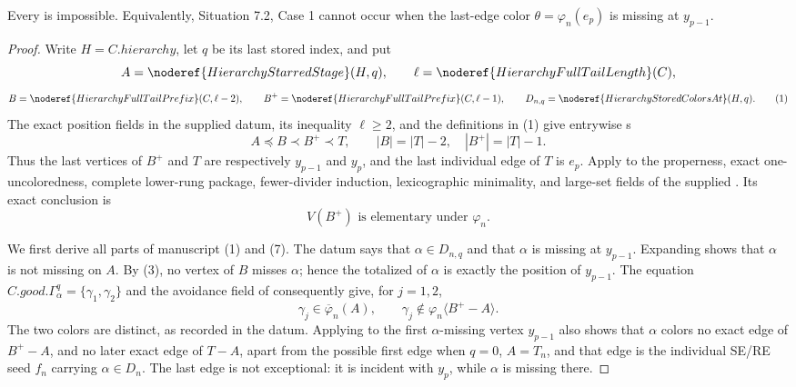\begin{lemma}
Every  is impossible.
Equivalently, Situation 7.2, Case 1 cannot occur when the last-edge color
\(\theta=\varphi_n(e_p)\) is missing at \(y_{p-1}\).
\end{lemma}
\begin{proof}
Write \(H=C.\mathit{hierarchy}\), let \(q\) be its last stored index, and
put
\[
 A=\noderef{HierarchyStarredStage}(H,q),\qquad
 \ell=\noderef{HierarchyFullTailLength}(C),
\]
\[
 B=\noderef{HierarchyFullTailPrefix}(C,\ell-2),\qquad
 B^+=\noderef{HierarchyFullTailPrefix}(C,\ell-1),\qquad
 D_{n,q}=\noderef{HierarchyStoredColorsAt}(H,q).              \tag{1}
\]
The exact position fields in the supplied datum, its inequality
\(\ell\ge2\), and the definitions in (1) give entrywise
s
\[
 A\preccurlyeq B\prec B^+\prec T,\qquad
 |B|=|T|-2,\quad |B^+|=|T|-1.                               \tag{2}
\]
Thus the last vertices of \(B^+\) and \(T\) are respectively
\(y_{p-1}\) and \(y_p\), and the last individual edge of \(T\) is
\(e_p\).  Apply
 to the properness,
exact one-uncoloredness, complete lower-rung package, fewer-divider
induction, lexicographic minimality, and large-set fields of the supplied
.  Its exact conclusion is
\[
             V(B^+)\text{ is elementary under }\varphi_n.    \tag{3}
\]

We first derive all parts of manuscript (1) and (7).  The datum says that
\(\alpha\in D_{n,q}\) and that \(\alpha\) is missing at
\(y_{p-1}\).  Expanding  shows that
\(\alpha\) is not missing on \(A\).  By (3), no vertex of \(B\) misses
\(\alpha\); hence the totalized
 of \(\alpha\) is exactly the
position of \(y_{p-1}\).  The equation
\(C.\mathit{good}.\Gamma^q_\alpha=\{\gamma_1,\gamma_2\}\) and the
avoidance field of  consequently give, for
\(j=1,2\),
\[
 \gamma_j\in\overline\varphi_n(A),\qquad
 \gamma_j\notin\varphi_n\langle B^+-A\rangle .               \tag{4}
\]
The two colors are distinct, as recorded in the datum.  Applying
 to the first
\(\alpha\)-missing vertex \(y_{p-1}\) also shows that \(\alpha\) colors
no exact edge of \(B^+-A\), and no later exact edge of \(T-A\), apart
from the possible first edge when \(q=0\), \(A=T_n\), and that edge is
the individual SE/RE seed \(f_n\) carrying \(\alpha\in D_n\).  The last
edge is not exceptional: it is incident with \(y_p\), while \(\alpha\)
is missing there.


\end{proof}
